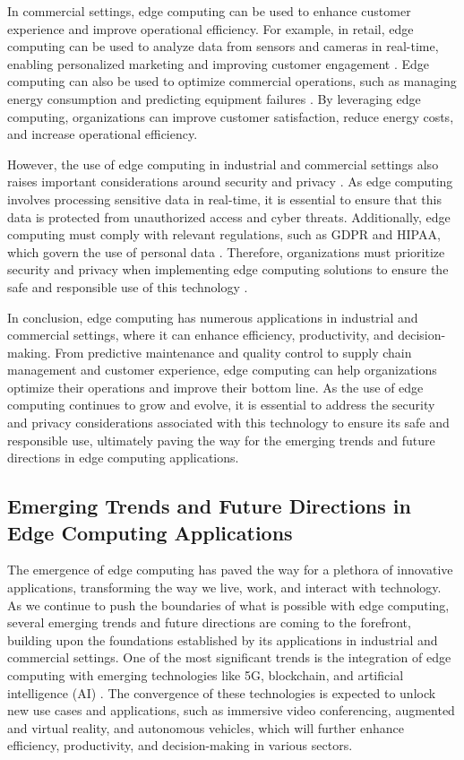 \documentclass[11pt]{article}
\begin{document}
In commercial settings, edge computing can be used to enhance customer experience and improve operational efficiency. For example, in retail, edge computing can be used to analyze data from sensors and cameras in real-time, enabling personalized marketing and improving customer engagement \cite{ref50}. Edge computing can also be used to optimize commercial operations, such as managing energy consumption and predicting equipment failures \cite{ref51}. By leveraging edge computing, organizations can improve customer satisfaction, reduce energy costs, and increase operational efficiency.

However, the use of edge computing in industrial and commercial settings also raises important considerations around security and privacy \cite{ref15}. As edge computing involves processing sensitive data in real-time, it is essential to ensure that this data is protected from unauthorized access and cyber threats. Additionally, edge computing must comply with relevant regulations, such as GDPR and HIPAA, which govern the use of personal data \cite{ref52}. Therefore, organizations must prioritize security and privacy when implementing edge computing solutions to ensure the safe and responsible use of this technology \cite{ref53}.

In conclusion, edge computing has numerous applications in industrial and commercial settings, where it can enhance efficiency, productivity, and decision-making. From predictive maintenance and quality control to supply chain management and customer experience, edge computing can help organizations optimize their operations and improve their bottom line. As the use of edge computing continues to grow and evolve, it is essential to address the security and privacy considerations associated with this technology to ensure its safe and responsible use, ultimately paving the way for the emerging trends and future directions in edge computing applications.

\subsection{Emerging Trends and Future Directions in Edge Computing Applications}

The emergence of edge computing has paved the way for a plethora of innovative applications, transforming the way we live, work, and interact with technology. As we continue to push the boundaries of what is possible with edge computing, several emerging trends and future directions are coming to the forefront, building upon the foundations established by its applications in industrial and commercial settings. One of the most significant trends is the integration of edge computing with emerging technologies like 5G, blockchain, and artificial intelligence (AI) \cite{ref54}. The convergence of these technologies is expected to unlock new use cases and applications, such as immersive video conferencing, augmented and virtual reality, and autonomous vehicles, which will further enhance efficiency, productivity, and decision-making in various sectors.
\end{document}
